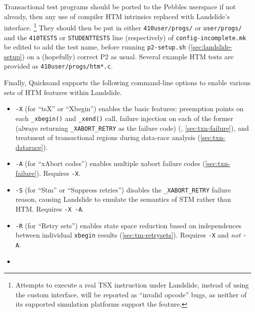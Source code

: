 Transactional test programs should be ported to the Pebbles userspace if not already,
then any use of compiler HTM intrinsics replaced with Landslide's interface.%
\footnote{Attempts to execute a real TSX instruction under Landslide, instead of using the custom interface,
will be reported as ``invalid opcode'' bugs,
as neither of its supported simulation platforms support the feature.
}
They should then be put in either {\tt 410user/progs/} or {\tt user/progs/}
and the {\tt 410TESTS} or {\tt STUDENTTESTS} line (respectively) of {\tt config-incomplete.mk} be edited to add the test name,
before running {\tt p2-setup.sh} (\cref{sec:landslide-setup})
on a (hopefully) correct P2 as usual.
Several example HTM tests are provided as {\tt 410user/progs/htm*.c}.

Finally, Quicksand supports the following command-line options to enable various sets of HTM features within Landslide.
\begin{itemize}
	\item {\tt -X} (for ``tsX'' or ``Xbegin'') enables the basic features:
		preemption points on each {\tt \_xbegin()} and {\tt \_xend()} call,
		failure injection on each of the former
		(always returning {\tt \_XABORT\_RETRY} as the failure code)
		(, \cref{sec:txn-failure}),
		and treatment of transactional regions during data-race analysis (\cref{sec:txn-datarace}).
	\item {\tt -A} (for ``xAbort codes'')
		enables multiple xabort failure codes (\cref{sec:txn-failure}).
		Requires {\tt -X}.
	\item {\tt -S} (for ``Stm'' or ``Suppress retries'')
		disables the {\tt \_XABORT\_RETRY} failure reason,
		causing Landslide to emulate the semantics of STM rather than HTM.
		Requires {\tt -X -A}.
	\item {\tt -R} (for ``Retry sets'')
		enables state space reduction based on independences between individual {\tt xbegin} results
		(\cref{sec:tm-retrysets}).
		Requires {\tt -X} and {\em not} {\tt -A}.
	\item {}
\end{itemize}

